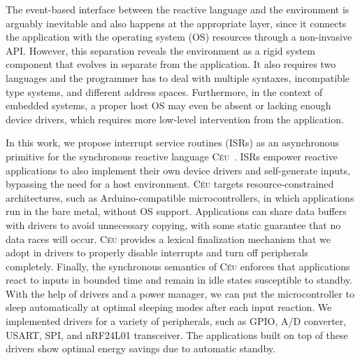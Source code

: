 \documentclass[sigplan,10pt,review,anonymous]{acmart}\settopmatter{printfolios=true,printccs=false,printacmref=false}
\newcommand{\CEU}{\textsc{C\'{e}u}\xspace}
\begin{document}
The event-based interface between the reactive language and the environment is
arguably inevitable and also happens at the appropriate layer, since it
connects the application with the operating system (OS) resources through a
non-invasive API.
%
However, this separation reveals the environment as a rigid system component
that evolves in separate from the application.
%
It also requires two languages and the programmer has to deal with multiple
syntaxes, incompatible type systems, and different address spaces.
%
Furthermore, in the context of embedded systems, a proper host OS may even be
absent or lacking enough device drivers, which requires more low-level
intervention from the application.

In this work, we propose interrupt service routines (ISRs) as an asynchronous
primitive for the synchronous reactive language \CEU~\cite{ceu.sensys13}.
ISRs empower reactive applications to also implement their own device drivers
and self-generate inputs, bypassing the need for a host environment.
%
\CEU targets resource-constrained architectures, such as Arduino-compatible
microcontrollers, in which applications run in the bare metal, without
OS support.
%
%
Applications can share data buffers with drivers to avoid unnecessary copying,
with some static guarantee that no data races will occur.
%
\CEU provides a lexical finalization mechanism that we adopt in drivers to
properly disable interrupts and turn off peripherals completely.
%
Finally, the synchronous semantics of \CEU enforces that applications react
to inputs in bounded time and remain in idle states susceptible to standby.
With the help of drivers and a power manager, we can put the microcontroller to
sleep automatically at optimal sleeping modes after each input reaction.
%
%
We implemented drivers for a variety of peripherals, such as GPIO, A/D
converter, USART, SPI, and nRF24L01 transceiver.
%
The applications built on top of these drivers show optimal energy savings due
to automatic standby.
\end{document}
